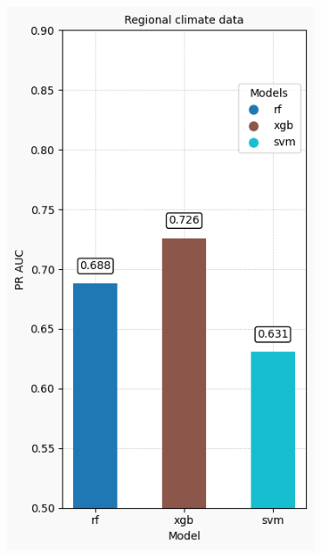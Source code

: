\documentclass{article}
\begin{document}
\begin{figure}[H]
\begin{subfigure}[b]{0.15\linewidth}
        \includegraphics[width=\linewidth]{Regional climate data'.png}
        \caption{}
        \label{fig:regional_climate}
    \end{subfigure}
    \hspace{0.1cm}
    \begin{subfigure}[b]{0.15\linewidth}
        \centering

\end{subfigure}
\end{figure}
\end{document}
